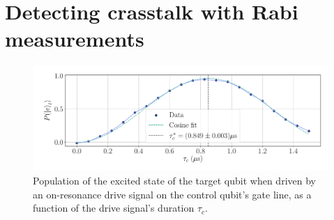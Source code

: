 \section{Detecting crasstalk with Rabi measurements}

\begin{figure}[t!]
    \centering
    \includegraphics[width = 0.8 \textwidth]{Images/Chap2.0/sigma.pdf}
    \vspace{-0.4cm}
    \caption{Population of the excited state of the target qubit when driven by an on-resonance drive signal on the control qubit's gate line, as a function of the drive signal's duration $\tau_c$.}
    \label{fig:sigmas}
\end{figure}

